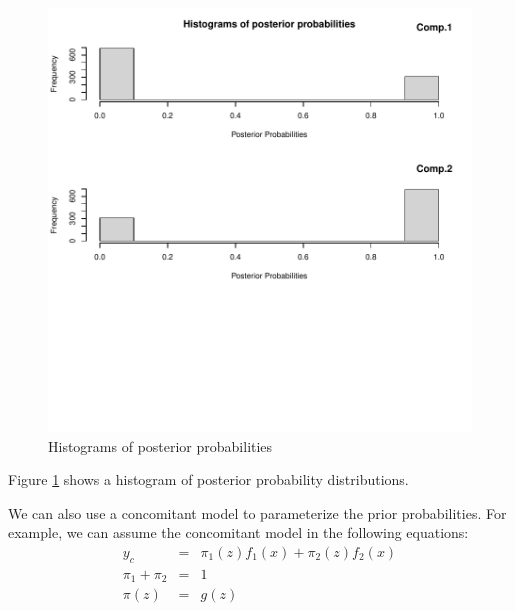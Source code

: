 \documentclass[nojss]{jss}
\begin{document}
\begin{figure}[htp]
\caption{Histograms of posterior probabilities}
\label{fig:plot2}
\centering
\includegraphics{em_intro-005}
\end{figure}

Figure \ref{fig:plot2} shows a histogram of posterior probability distributions.

We can also use a concomitant model to parameterize the prior probabilities. For example, we can assume the concomitant model in the following equations:
  \begin{eqnarray}
  y_c &=&  \pi_1(z) f_1(x) + \pi_2(z) f_2(x)\\
  \pi_1 + \pi_2 &=& 1 \\
  \pi(z) &=& g(z) 
  \end{eqnarray}
\end{document}
